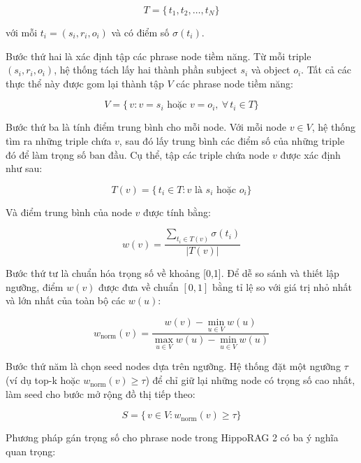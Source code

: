 \documentclass[../main.tex]{subfiles}
\begin{document}
\begin{equation}
T = \{\,t_1, t_2, \dots, t_N\}
\end{equation}

với mỗi \(t_i = (s_i, r_i, o_i)\) và có điểm số \(\sigma(t_i)\).

Bước thứ hai là xác định tập các phrase node tiềm năng. Từ mỗi triple \((s_i, r_i, o_i)\), hệ thống tách lấy hai thành phần subject \(s_i\) và object \(o_i\). Tất cả các thực thể này được gom lại thành tập \(V\) các phrase node tiềm năng:

\begin{equation}
V = \{\,v : v = s_i \text{ hoặc } v = o_i,\ \forall\,t_i \in T\}
\end{equation}

Bước thứ ba là tính điểm trung bình cho mỗi node. Với mỗi node \(v \in V\), hệ thống tìm ra những triple chứa \(v\), sau đó lấy trung bình các điểm số của những triple đó để làm trọng số ban đầu. Cụ thể, tập các triple chứa node \(v\) được xác định như sau:

\begin{equation}
T(v) = \{\,t_i \in T : v \text{ là } s_i \text{ hoặc } o_i\}
\end{equation}

Và điểm trung bình của node \(v\) được tính bằng:

\begin{equation}
w(v) = \frac{\sum_{t_i \in T(v)} \sigma(t_i)}{|T(v)|}
\end{equation}

Bước thứ tư là chuẩn hóa trọng số về khoảng [0,1]. Để dễ so sánh và thiết lập ngưỡng, điểm \(w(v)\) được đưa về chuẩn \([0,1]\) bằng tỉ lệ so với giá trị nhỏ nhất và lớn nhất của toàn bộ các \(w(u)\):

\begin{equation}
w_{\mathrm{norm}}(v) = \frac{w(v) - \min_{u\in V} w(u)}{\max_{u\in V} w(u) - \min_{u\in V} w(u)}
\end{equation}

Bước thứ năm là chọn seed nodes dựa trên ngưỡng. Hệ thống đặt một ngưỡng \(\tau\) (ví dụ top-k hoặc \(w_{\mathrm{norm}}(v)\ge\tau\)) để chỉ giữ lại những node có trọng số cao nhất, làm seed cho bước mở rộng đồ thị tiếp theo:

\begin{equation}
S = \{\,v\in V : w_{\mathrm{norm}}(v)\ge\tau\}
\end{equation}

Phương pháp gán trọng số cho phrase node trong HippoRAG 2 có ba ý nghĩa quan trọng:
\end{document}
